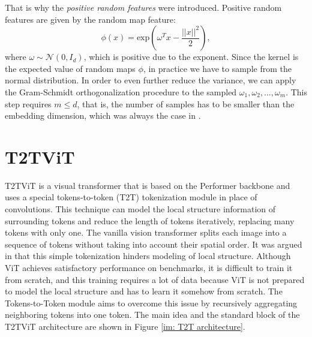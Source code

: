 \documentclass[magisterska,en]{pracamgr}
\begin{document}
That is why the \textit{positive random features} were introduced. Positive random features are given by the random map feature:
\begin{equation*}
    \phi(x) = \textrm{exp}\left(\omega^T x-\frac{||x||^2}{2}\right),
\end{equation*}
where $\omega \sim \mathcal{N}(0, I_d)$, which is positive due to the exponent. Since the kernel is the expected value of random maps $\phi$, in practice we have to sample from the normal distribution. In order to even further reduce the variance, we can apply the Gram-Schmidt orthogonalization procedure to the sampled $\omega_1, \omega_2, \ldots, \omega_m$. This step requires $m\leq d$, that is, the number of samples has to be smaller than the embedding dimension, which was always the case in \cite{DBLP:conf/iclr/ChoromanskiLDSG21}.

\section{T2T\textunderscore ViT}\label{s:T2T}

T2T\textunderscore ViT \cite{DBLP:conf/iccv/0007CWYSJTFY21} is a visual transformer that is based on the Performer backbone and uses a special tokens-to-token (T2T) tokenization module in place of convolutions. This technique can model the local structure information of surrounding tokens and reduce the length of tokens iteratively, replacing many tokens with only one. The vanilla vision transformer splits each image into a sequence of tokens without taking into account their spatial order. It was argued in \cite{DBLP:conf/iccv/0007CWYSJTFY21} that this simple tokenization hinders modeling of local structure. Although ViT achieves satisfactory performance on benchmarks, it is difficult to train it from scratch, and this training requires a lot of data because ViT is not prepared to model the local structure and has to learn it somehow from scratch. The Tokens-to-Token module aims to overcome this issue by recursively aggregating neighboring tokens into one token. The main idea and the standard block of the T2T\textunderscore ViT architecture are shown in Figure \ref{im: T2T architecture}.
\end{document}
